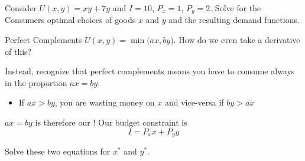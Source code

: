\documentclass[12pt,t]{beamer}
\begin{document}
\begin{frame}
  
  \bigskip
  Consider $U(x,y) = xy + 7y$ and $I=10$, $P_{x} = 1$, $P_{y}=2$. Solve for the Consumers optimal choices of goods $x$ and $y$ and the resulting demand functions.
\end{frame}

\begin{frame}{Perfect Complements}
  $U(x,y) = \min\big( ax, by \big)$. How do we even take a derivative of this?

  \pause\bigskip
  Instead, recognize that perfect complements means you have to consume always in the proportion $ax = by$. 
  \begin{itemize}
    \item If $ax > by$, you are wasting money on $x$ and vice-versa if $by > ax$
  \end{itemize}

  \pause\bigskip
  $ax = by$ is therefore our ! Our budget constraint is 
  $$
    I = P_x x + P_y y
  $$

  \bigskip
  Solve these two equations for $x^*$ and $y^*$.
\end{frame}
\end{document}
